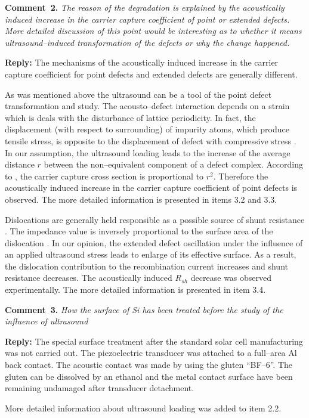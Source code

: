 \documentclass [sort&compress] {elsarticle}
\begin{document}
\vspace{1cm}
\noindent
\textcolor[rgb]{0.00,0.50,1.00}{\textbf{Comment~2.}}
\emph{The reason of the degradation is explained by the acoustically induced increase
in the carrier capture coefficient of point or extended defects. More detailed discussion of this point would be interesting as to whether it means ultrasound--induced transformation of the defects or why the change happened.}

\noindent
\textcolor[rgb]{0.51,0.00,0.00}{\textbf{Reply:}}
The mechanisms of the acoustically induced increase in the carrier capture coefficient 
for point defects and extended defects are generally different.

As was mentioned above the ultrasound can be a tool of the point defect transformation and study.
The acousto--defect interaction depends on a strain which is deals with the disturbance of lattice periodicity.
In fact, the displacement (with respect to surrounding) of impurity atoms, which produce tensile stress,
is opposite to the displacement of defect with compressive stress \cite{MirzadeJAP2011,PeleshchakUJF2016}.
In our assumption, the ultrasound loading leads to the increase of the average distance $r$ between the non--equivalent
component of a defect complex.
According to \cite{CDLR:JAP,CDLR:R2}, the carrier capture cross section is proportional to $r^2$.
Therefore the acoustically induced increase in the carrier capture coefficient of point defects is observed.
The more detailed information is presented in items 3.2 and 3.3.

Dislocations are generally held responsible as a possible source of shunt resistance \cite{Rsh:Breitenstein,TAT:Gopal,Rsh:Baker}.
The impedance value is inversely proportional to the surface area of the dislocation \cite{Rsh:Gopal2003,Rsh:Gopal2004}.
In our opinion, the extended defect oscillation under the influence of an applied ultrasound stress leads to enlarge of its effective surface.
As a result, the dislocation contribution to the recombination current increases and shunt resistance decreases.
The acoustically induced $R_{sh}$ decrease was observed experimentally.
The more detailed information is presented in item 3.4.

\vspace{1cm}
\noindent
\textcolor[rgb]{0.00,0.50,1.00}{\textbf{Comment~3.}}
\emph{How the surface of Si has been treated before the study of the influence of ultrasound}

\noindent
\textcolor[rgb]{0.51,0.00,0.00}{\textbf{Reply:}}
The special surface treatment after the standard solar cell manufacturing was not carried out.
The piezoelectric transducer was attached to a full--area Al back contact.
The acoustic contact was made by using the gluten ``BF--6''.
The gluten can be dissolved by an ethanol and
the metal contact surface have been remaining undamaged after transducer detachment.

More detailed information about ultrasound loading was added to item 2.2.







\end{document}
